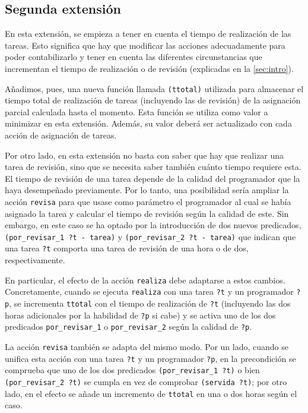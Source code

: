 
\subsection{Segunda extensión} \label{sec:mod-ext2}

En esta extensión, se empieza a tener en cuenta el tiempo de realización de 
las tareas. Esto significa que hay que modificar las acciones adecuadamente 
para poder contabilizarlo y tener en cuenta las diferentes circunstancias que 
incrementan el tiempo de realización o de revisión (explicadas en la 
\autoref{sec:intro}).

Añadimos, pues, una nueva función llamada \texttt{(ttotal)} utilizada para 
almacenar el tiempo total de realización de tareas (incluyendo las de 
revisión) de la asignación parcial calculada hasta el momento. Esta función 
se utiliza como valor a minimizar en esta extensión. Además, su valor deberá 
ser actualizado con cada acción de asignación de tareas.

Por otro lado, en esta extensión no basta con saber que hay que realizar una 
tarea de revisión, sino que se necesita saber también cuánto tiempo requiere 
esta. El tiempo de revisión de una tarea depende de la calidad del programador 
que la haya desempeñado previamente. Por lo tanto, una posibilidad sería 
ampliar la acción \texttt{revisa} para que usase como parámetro el programador 
al cual se había asignado la tarea y calcular el tiempo de revisión según la 
calidad de este. Sin embargo, en este caso se ha optado por la introducción de 
dos nuevos predicados, \texttt{(por\_revisar\_1 ?t - tarea)} y 
\texttt{(por\_revisar\_2 ?t - tarea)} que indican que una tarea \texttt{?t} 
comporta una tarea de revisión de una hora o de dos, respectivamente. 

En particular, el efecto de la acción \texttt{realiza} debe adaptarse a estos 
cambios. Concretamente, cuando se ejecuta \texttt{realiza} con una tarea 
\texttt{?t} y un programador \texttt{?p}, se incrementa \texttt{ttotal} con 
el tiempo de realización de \texttt{?t} (incluyendo las dos horas adicionales 
por la habilidad de \texttt{?p} si cabe) y se activa uno de los dos predicados 
\texttt{por\_revisar\_1} o \texttt{por\_revisar\_2} según la calidad de 
\texttt{?p}.

La acción \texttt{revisa} también se adapta del mismo modo. Por un lado, 
cuando se unifica esta acción con una tarea \texttt{?t} y un programador 
\texttt{?p}, en la precondición se comprueba que uno de los dos predicados 
\texttt{(por\_revisar\_1 ?t)} o bien \texttt{(por\_revisar\_2 ?t)} se cumpla 
en vez de comprobar \texttt{(servida ?t)}; por otro lado, en el efecto se 
añade un incremento de \texttt{ttotal} en una o dos horas según el caso.





